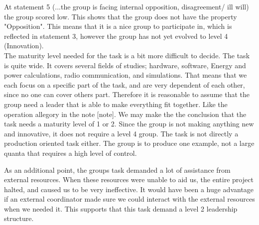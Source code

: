	At statement 5 (...the group is facing internal opposition, disagreement/ ill will) the group scored low. This shows that the group does not have the property "Opposition". This means that it is a nice group to participate in, which is reflected in statement 3, however the group has not yet evolved to level 4 (Innovation).
\\	
The maturity level needed for the task is a bit more difficult to decide. The task is quite wide. It covers several fields of studies; hardware, software, Energy and power calculations, radio communication, and simulations. That means that we each focus on a specific part of the task, and are very dependent of each other, since no one can cover others part. Therefore it is reasonable to assume that the group need a leader that is able to make everything fit together. Like the operation allegory in the note [note]. We may make the the conclusion that the task needs a maturity level of 1 or 2. Since the group is not making anything new and innovative, it does not require a level 4 group. The task is not directly a production oriented task either. The group is to produce one example, not a large quanta that requires a high level of control. 

As an additional point, the groups task demanded a lot of assistance from external resources. When these resources were unable to aid us, the entire project halted, and caused us to be very ineffective. It would have been a huge advantage if an external coordinator made sure we could interact with the external resources when we needed it. This supports that this task demand a level 2 leadership structure.     

